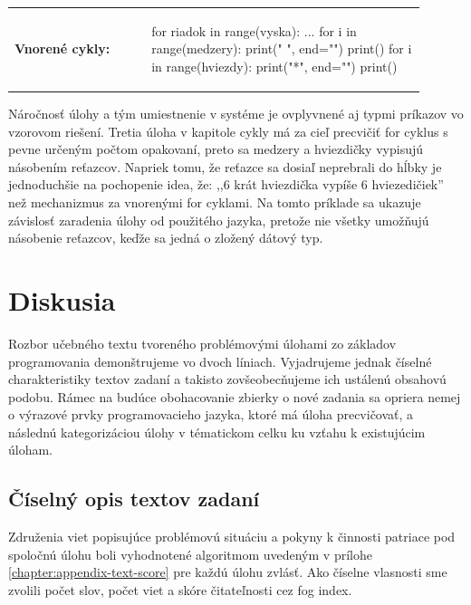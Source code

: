 \vspace{-2em}
\begin{tabular}{@{}p{0.3\linewidth}p{0.6\linewidth}}
\textbf{\small Vnorené cykly:} &
\vspace{-1em}
\begin{solution}
for riadok in range(vyska):
	...
	for i in range(medzery):
		print(" ", end="")
	print()
	for i in range(hviezdy):
		print("*", end="")
	print()
\end{solution}
\end{tabular}

Náročnosť úlohy a tým umiestnenie v systéme je ovplyvnené aj typmi príkazov vo vzorovom riešení. Tretia úloha v kapitole cykly má za cieľ precvičiť for cyklus s pevne určeným počtom opakovaní, preto sa medzery a hviezdičky vypisujú násobením reťazcov. Napriek tomu, že reťazce sa dosiaľ neprebrali do hĺbky je jednoduchšie na pochopenie idea, že: ,,6 krát hviezdička vypíše 6 hviezedičiek'' než mechanizmus za vnorenými for cyklami. Na tomto príklade sa ukazuje závislosť zaradenia úlohy od použitého jazyka, pretože nie všetky umožňujú násobenie reťazcov, keďže sa jedná o zložený dátový typ.

\section{Diskusia}
Rozbor učebného textu tvoreného problémovými úlohami zo základov programovania demonštrujeme vo dvoch líniach. Vyjadrujeme jednak číselné charakteristiky textov zadaní a takisto zovšeobecňujeme ich ustálenú obsahovú podobu. Rámec na budúce obohacovanie zbierky o nové zadania sa opriera nemej o výrazové prvky programovacieho jazyka, ktoré má úloha precvičovať, a následnú kategorizáciou úlohy v tématickom celku ku vzťahu k existujúcim úloham. 

\subsection{Číselný opis textov zadaní}
Združenia viet popisujúce problémovú situáciu a pokyny k činnosti patriace pod spoločnú úlohu boli vyhodnotené algoritmom uvedeným v prílohe \ref{chapter:appendix-text-score} pre každú úlohu zvlásť. Ako číselne vlasnosti sme zvolili počet slov, počet viet a skóre čitateľnosti cez fog index. 

